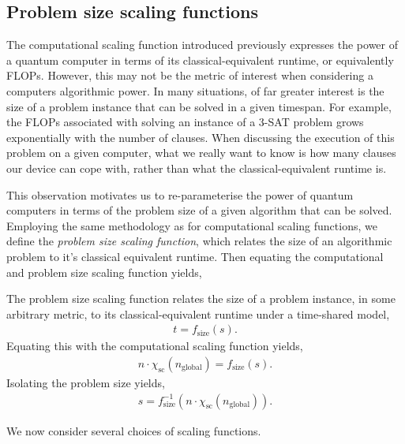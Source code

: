 %
%

\subsection{Problem size scaling functions}\label{sec:prob_sc_func}

The computational scaling function introduced previously expresses the power of a quantum computer in terms of its classical-equivalent runtime, or equivalently FLOPs. However, this may not be the metric of interest when considering a computers algorithmic power. In many situations, of far greater interest is the size of a problem instance that can be solved in a given timespan. For example, the FLOPs associated with solving an instance of a 3-\textsc{SAT} problem grows exponentially with the number of clauses. When discussing the execution of this problem on a given computer, what we really want to know is how many clauses our device can cope with, rather than what the classical-equivalent runtime is.

This observation motivates us to re-parameterise the power of quantum computers in terms of the problem size of a given algorithm that can be solved. Employing the same methodology as for computational scaling functions, we define the \textit{problem size scaling function}, which relates the size of an algorithmic problem to it's classical equivalent runtime. Then equating the computational and problem size scaling function yields,

\begin{definition}
The problem size scaling function relates the size of a problem instance, in some arbitrary metric, to its classical-equivalent runtime under a time-shared model,
\begin{align}
t = f_\text{size}(s).
\end{align}
Equating this with the computational scaling function yields,
\begin{align}
	n\cdot \chi_\text{sc}(n_\text{global}) = f_\text{size}(s).
\end{align}
Isolating the problem size yields,
\begin{align}
s = f_\text{size}^{-1}(n\cdot \chi_\text{sc}(n_\text{global})).
\end{align}
\end{definition}

We now consider several choices of scaling functions.

